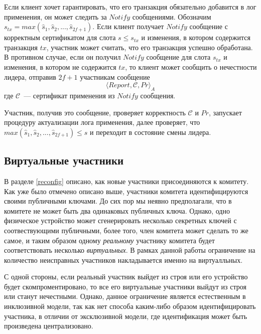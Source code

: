 Если клиент хочет гарантировать, что его транзакция обязательно добавится в лог применения, он может следить за $Notify$ сообщениями. Обозначим $s_{tx}=max(\hat{s}_1,  \hat{s}_2,..., \hat{s}_{2f+1})$. Если клиент получает $Notify$ сообщение с корректным сертификатом для слота $s \le s_{tx}$ и изменения, в котором содержится транзакция $tx$, участник может считать, что его транзакция успешно обработана. В противном случае, если он получил $Notify$ сообщение для слота $s_{tx}$ и изменения, в котором не содержится $tx$, то клиент может сообщить о нечестности лидера, отправив $2f+1$ участникам сообщение
\[ \langle Report, \mathcal{C}, Pr \rangle_A \]
где $\mathcal{C}$~--- сертификат применения из $Notify$ сообщения.

Участник, получив это сообщение, проверяет корректность $\mathcal{C}$ и $Pr$, запускает процедуру актуализации лога применения, далее проверяет, что $max(\hat{s}_1,  \hat{s}_2,..., \hat{s}_{2f+1}) \le s$ и переходит в состояние смены лидера.

\subsection{Виртуальные участники}
В разделе \ref{reconfig} описано, как новые участники присоединяются к комитету. Как уже было отмечено описано выше, участники комитета идентифицируются своими публичными ключами. До сих пор мы неявно предполагали, что в комитете не может быть два одинаковых публичных ключа. Однако, одно физическое устройство может сгенерировать несколько секретных ключей с соотвествующими публичными, более того, член комитета может сделать то же самое, и таким образом одному \textit{реальному} участнику комитета будет соответствовать несколько \textit{виртуальных}. В рамках данной работы ограничение на количество неисправных участников накладывается именно на виртуалльных.

С одной стороны, если реальный участник выйдет из строя или его устройство будет скомпроментировано, то все его виртуальные участники выйдут из строя или станут нечестными.  Однако, данное ограничение является естественным в инклюзивной модели, так как нет способа каким-либо образом идентифицировать участника, в отличии от эксклюзивной модели, где идентификация может быть произведена централизовано.


